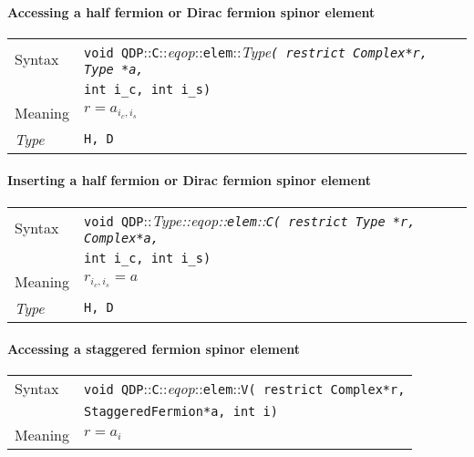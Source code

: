 \documentclass[12pt,letterpaper]{article}
\newcommand{\tComplex}{Complex}
\newcommand{\tStaggeredFermion}{StaggeredFermion}
\newcommand{\namespace}{QDP}
\newcommand{\ttdash}{{::}}
\newcommand{\itt}{\it Type}
\newcommand{\extraarg}{}
\begin{document}
\paragraph{Accessing a half fermion or Dirac fermion spinor element}

\begin{flushleft}
  \begin{tabular}{|l|l|}
  \hline
  Syntax      & {\tt void \namespace}\ttdash{\tt C}\ttdash{\it eqop}\ttdash{\tt elem}\ttdash\itt{\tt ( restrict \tComplex *r, Type *a,}\\
              & {\tt int i\_c, int i\_s\extraarg)} \\
  \hline
  Meaning     & $r = a_{i_c,i_s}$\\
  \hline
  \itt        & {\tt H, D} \\
  \hline
  \end{tabular}
\end{flushleft}

\paragraph{Inserting a half fermion or Dirac fermion spinor element}

\begin{flushleft}
  \begin{tabular}{|l|l|}
  \hline
  Syntax      & {\tt void \namespace}\ttdash\itt\ttdash{\it eqop}\ttdash{\tt elem}\ttdash{\tt C( restrict Type *r, \tComplex *a, }\\
              & {\tt int i\_c, int i\_s\extraarg)} \\
  \hline
  Meaning     & $r_{i_c,i_s} = a$\\
  \hline
  \itt        & {\tt H, D} \\
  \hline
  \end{tabular}
\end{flushleft}

\paragraph{Accessing a staggered fermion spinor element}

\begin{flushleft}
  \begin{tabular}{|l|l|}
  \hline
  Syntax      & {\tt void \namespace}\ttdash{\tt C}\ttdash{\it eqop}\ttdash{\tt elem}\ttdash{\tt V( restrict \tComplex *r,}\\
              & {\tt \tStaggeredFermion *a, int i\extraarg)} \\
  \hline
  Meaning     & $r = a_i$\\
  \hline
  \end{tabular}
\end{flushleft}
\end{document}
